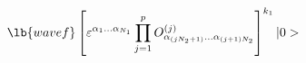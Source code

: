 \begin{equation}
\lb{wavef}
\left[ \varepsilon ^{\alpha _{1}...\alpha _{N_{1}}}
\prod_{j=1}^{p}O_{\alpha_{\left( jN_{2}+1\right) }...
\alpha _{\left( j+1\right) N_{2}}}^{\left(j\right) }
\right] ^{k_{1}}|0>
\end{equation}

